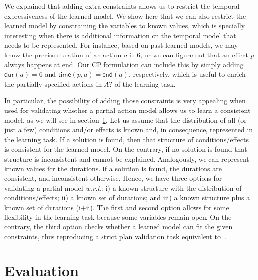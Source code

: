 \documentclass[runningheads]{llncs}
\newcommand{\dur}{\mathsf{dur}}    %
\newcommand{\en}{\mathsf{end}}     %
\newcommand{\tim}{\mathsf{time}}   %
\begin{document}
We explained that adding extra constraints allows us to restrict the temporal expressiveness of the learned model. We show here that we can also restrict the learned model by constraining the variables to known values, which is specially interesting when there is additional information on the temporal model that needs to be represented. For instance, based on past learned models, we may know the precise duration of an action $a$ is 6,
or we can figure out that an effect $p$ always happens at end.
Our CP formulation can include this by simply adding $\dur(a)=6$ and $\tim(p,a)=\en(a)$, respectively, which is useful to enrich the partially specified actions in $A?$ of the learning task.

In particular, the possibility of adding those constraints is very appealing when used for validating whether a partial action model allows us to learn a consistent model, as we will see in section~\ref{sec:evaluation}.
Let us assume that the distribution of all (or just a few) conditions and/or effects is known and, in consequence, represented in the learning task. If a solution is found, then that structure of conditions/effects is consistent for the learned model. On the contrary, if no solution is found that structure is inconsistent and cannot be explained.
Analogously, we can represent known values for the durations. If a solution is found, the durations are consistent, and inconsistent otherwise.
Hence, we have three options for validating a partial model \emph{w.r.t.}: i) a known structure with the distribution of conditions/effects; ii) a known set of durations; and iii) a known structure plus a known set of durations (i+ii).
The first and second option allows for some flexibility in the learning task because some variables remain open. On the contrary, the third option checks whether a learned model can fit the given constraints, thus reproducing a strict plan validation task equivalent to~\cite{howey2004val}.



\section{Evaluation}
\label{sec:evaluation}
\end{document}
